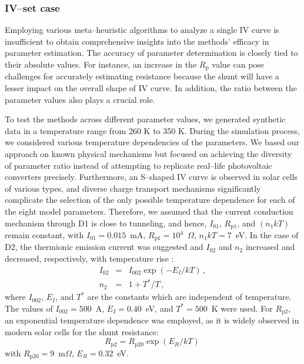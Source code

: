 \documentclass[a4paper,fleqn]{cas-sc}
\begin{document}
\subsubsection{IV--set case}\label{SetIV}
Employing various meta--heuristic algorithms to analyze a single IV curve
is insufficient to obtain comprehensive insights into the methods' efficacy in parameter estimation.
The accuracy of parameter determination is closely tied to their absolute values.
For instance, an increase in the $R_\mathrm{p}$ value can pose challenges for accurately estimating resistance
because the shunt will have a lesser impact on the overall shape of IV curve.
In addition, the ratio between the parameter values also plays a crucial role.

To test the methods across different parameter values, we generated synthetic data in a temperature range from 260 K to 350 K.
During the simulation process, we considered various temperature dependencies of the parameters.
We based our approach on known physical mechanisms but focused on achieving the diversity of parameter ratio
instead of attempting to replicate real--life photovoltaic converters precisely.
Furthermore, an S--shaped IV curve is observed in solar cells of various types,
and diverse charge transport mechanisms significantly complicate the selection of
the only possible temperature dependence for each of the eight model parameters.
Therefore, we assumed that the current conduction mechanism through D1 is close to tunneling,
and hence, $I_{01}$, $R_\mathrm{p1}$, and $(n_1kT)$ remain constant,
with $I_{01}=0.015$~mA, $R_\mathrm{p1}=10^4$~$\Omega$, $n_1kT=7$~eV.
In the case of D2, the thermionic emission current was suggested
and $I_{02}$ and $n_2$ increased and decreased, respectively, with temperature rise \cite{Sze2012}:
\begin{eqnarray}
I_{02}&=& I_{002}\exp\left(-E_I/kT\right)\,,\\
n_2&=&1+T^*/T\,,
\end{eqnarray}
where $I_{002}$, $E_I$, and $T^*$ are the constants which are independent of temperature.
The values of $I_{002}=500$~A, $E_I=0.40$~eV, and $T^*=500$~K were used.
For $R_\mathrm{p2}$, an exponential temperature dependence was employed,
as it is widely observed \cite{Kondratenko2019} in modern solar cells for the shunt resistance:
\begin{equation}
R_\mathrm{p2}=R_\mathrm{p20}\exp\left(E_R/kT\right)\,
\end{equation}
with
$R_\mathrm{p20}=9$~m$\Omega$,
$E_R=0.32$~eV.
\end{document}
